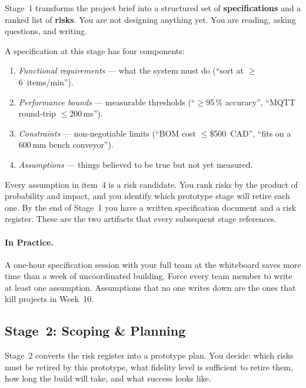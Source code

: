 Stage~1 transforms the project brief into a structured set of
\textbf{specifications} and a ranked list of
\textbf{risks}.
You are not designing anything yet.
You are reading, asking questions, and writing.

A specification at this stage has four components:
\begin{enumerate}
  \item \emph{Functional requirements} --- what the system must do
        (``sort at $\geq$6~items/min'').
  \item \emph{Performance bounds} --- measurable thresholds
        (``$\geq$95\,\% accuracy'', ``MQTT round-trip $\leq$200\,ms'').
  \item \emph{Constraints} --- non-negotiable limits
        (``BOM cost $\leq$\$500~CAD'', ``fits on a 600\,mm bench conveyor'').
  \item \emph{Assumptions} --- things believed to be true but not yet measured.
\end{enumerate}

Every assumption in item~4 is a risk candidate.
You rank risks by the product of probability and impact, and you identify
which prototype stage will retire each one.
By the end of Stage~1 you have a written specification document and a risk
register.
These are the two artifacts that every subsequent stage references.

\paragraph{In Practice.}
A one-hour specification session with your full team at the whiteboard saves
more time than a week of uncoordinated building.
Force every team member to write at least one assumption.
Assumptions that no one writes down are the ones that kill projects in
Week~10.

\subsection{Stage~2: Scoping \& Planning}
\label{sec:ch3-stage2}

Stage~2 converts the risk register into a prototype plan.
You decide: which risks must be retired by this prototype, what fidelity
level is sufficient to retire them, how long the build will take, and what
success looks like.

